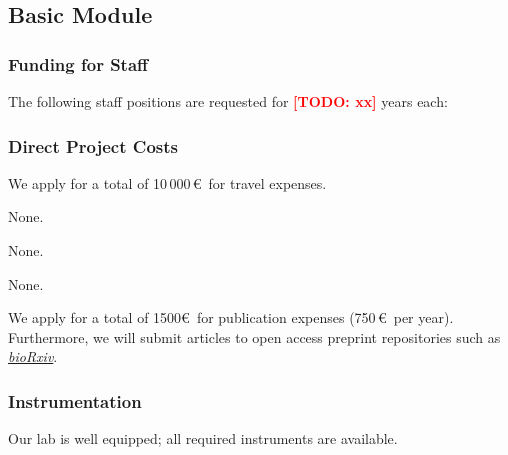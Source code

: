 \documentclass{scrartcl}
\newcommand{\todo}[1]{\xspace{\textcolor{red}{\bfseries[TODO: #1]}}\xspace}
\begin{document}
\subsection{Basic Module}

\subsubsection{Funding for Staff}
\begin{funds}
The following staff positions are requested for \todo{xx} years each:


\end{funds}

\subsubsection{Direct Project Costs}
\begin{funds}



We apply for a total of 10\,000\,\euro\ for travel expenses.

None.

None.

None.

We apply for a total of 1500\euro\ for publication expenses (750\,\euro\ per
year). Furthermore, we will submit articles to open access preprint repositories
such as \href{https://www.biorxiv.org/}{\textit{bioRxiv}}.

\end{funds}

\subsubsection{Instrumentation}

Our lab is well equipped; all required instruments are available.
\end{document}
